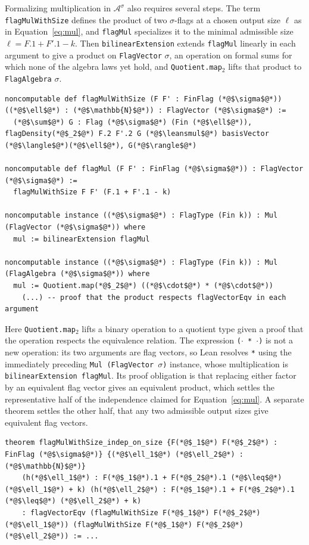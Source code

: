 \documentclass[acmsmall,screen=true,acmthm=false]{acmart}
\DeclareRobustCommand{\lean}[1]{{\def\_{\textunderscore\allowbreak}\texttt{#1}}}
\newcommand{\leansmul}{\mathbin{\vcenter{\hbox{$\scriptstyle\bullet$}}}}
\begin{document}
Formalizing multiplication in $\mathcal{A}^\sigma$ also requires several
steps.  The term \lean{flagMulWithSize} defines
the product of two $\sigma$-flags at a chosen output size $\ell$ as in
Equation~\eqref{eq:mul}, and \lean{flagMul} specializes it to the minimal
admissible size $\ell = F.1 + F'.1 - k$.  Then \lean{bilinearExtension}
extends \lean{flagMul} linearly in each argument to give a product on
\lean{FlagVector} $\sigma$, an operation on formal sums for which none of the
algebra laws yet hold, and \lean{Quotient.map$_2$} lifts that product to
\lean{FlagAlgebra} $\sigma$.
\begin{lstlisting}
noncomputable def flagMulWithSize (F F' : FinFlag (*@$\sigma$@*)) ((*@$\ell$@*) : (*@$\mathbb{N}$@*)) : FlagVector (*@$\sigma$@*) :=
  (*@$\sum$@*) G : Flag (*@$\sigma$@*) (Fin (*@$\ell$@*)), flagDensity(*@$_2$@*) F.2 F'.2 G (*@$\leansmul$@*) basisVector (*@$\langle$@*)(*@$\ell$@*), G(*@$\rangle$@*)

noncomputable def flagMul (F F' : FinFlag (*@$\sigma$@*)) : FlagVector (*@$\sigma$@*) :=
  flagMulWithSize F F' (F.1 + F'.1 - k)

noncomputable instance ((*@$\sigma$@*) : FlagType (Fin k)) : Mul (FlagVector (*@$\sigma$@*)) where
  mul := bilinearExtension flagMul

noncomputable instance ((*@$\sigma$@*) : FlagType (Fin k)) : Mul (FlagAlgebra (*@$\sigma$@*)) where
  mul := Quotient.map(*@$_2$@*) ((*@$\cdot$@*) * (*@$\cdot$@*))
    (...) -- proof that the product respects flagVectorEqv in each argument
\end{lstlisting}
Here \lean{Quotient.map$_2$} lifts a binary operation to a quotient type given
a proof that the operation respects the equivalence relation.  The expression
\lean{($\cdot$ * $\cdot$)} is not a new operation: its two arguments are flag
vectors, so Lean resolves \lean{*} using the immediately preceding
\lean{Mul (FlagVector}~$\sigma$\lean{)} instance, whose multiplication is
\lean{bilinearExtension flagMul}.  Its proof obligation is that replacing
either factor by an equivalent flag vector gives an equivalent product, which
settles the representative half of the independence claimed for
Equation~\eqref{eq:mul}.  A separate theorem settles the other half, that any
two admissible output sizes give equivalent flag vectors.
\begin{lstlisting}
theorem flagMulWithSize_indep_on_size {F(*@$_1$@*) F(*@$_2$@*) : FinFlag (*@$\sigma$@*)} {(*@$\ell_1$@*) (*@$\ell_2$@*) : (*@$\mathbb{N}$@*)}
    (h(*@$\ell_1$@*) : F(*@$_1$@*).1 + F(*@$_2$@*).1 (*@$\leq$@*) (*@$\ell_1$@*) + k) (h(*@$\ell_2$@*) : F(*@$_1$@*).1 + F(*@$_2$@*).1 (*@$\leq$@*) (*@$\ell_2$@*) + k)
    : flagVectorEqv (flagMulWithSize F(*@$_1$@*) F(*@$_2$@*) (*@$\ell_1$@*)) (flagMulWithSize F(*@$_1$@*) F(*@$_2$@*) (*@$\ell_2$@*)) := ...
\end{lstlisting}
\end{document}
